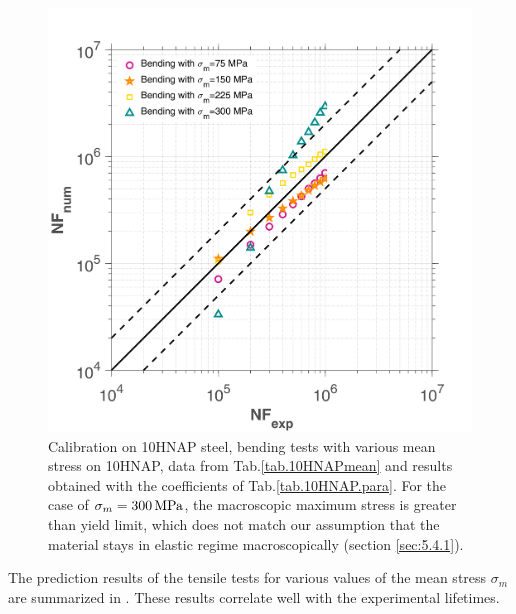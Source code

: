 \begin{figure}[!h]
	\centering
	\includegraphics[width=\textwidth]{figures//10HNAP_b1D_m_err.png} 
	\caption{Calibration on 10HNAP steel, bending tests with various mean stress on 10HNAP, data from Tab.\ref{tab.10HNAPmean}  and results obtained with the coefficients of Tab.\ref{tab.10HNAP.para}. For the case of $\sigma_m=300 \, \textnormal{MPa}$, the macroscopic maximum stress is greater than yield limit, which does not match our assumption that the material stays in elastic regime macroscopically (section \ref{sec:5.4.1}).}
	\label{fig.10HNAP2}
\end{figure}


The prediction results of the tensile tests for various values of the mean stress $\sigma_m$ are summarized in . These results correlate well with the experimental lifetimes. 


